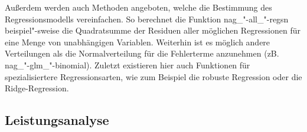 Außerdem werden auch Methoden angeboten, welche die Bestimmung des Regressionsmodells vereinfachen.
So berechnet die Funktion nag\_"-all\_"-regsn beispiel"-sweise die Quadratsumme der Residuen aller möglichen Regressionen für eine Menge von unabhängigen Variablen.
Weiterhin ist es möglich andere Verteilungen als die Normalverteilung für die Fehlerterme anzunehmen (zB. nag\_"-glm\_"-binomial).
Zuletzt existieren hier auch Funktionen für spezialisiertere Regressionsarten, wie zum Beispiel die robuste Regression oder die Ridge-Regression.

\subsection{Leistungsanalyse}
\label{sec:leistungsanalyse}


